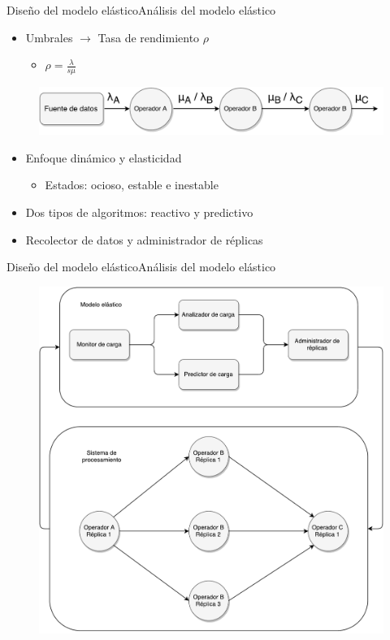 \begin{frame}{Diseño del modelo elástico}{Análisis del modelo elástico}
\begin{itemize}
\item Umbrales $\rightarrow$ Tasa de rendimiento $\rho$
	\begin{itemize}
		\item $\rho = \frac{\lambda}{s \mu}$
	\end{itemize}
\end{itemize}

\begin{figure}[!hb]
	\centering
	\includegraphics[scale=0.35]{images/AnalisisTeoriaColas.pdf}
\end{figure}

\begin{itemize}
\item Enfoque dinámico y elasticidad
\begin{itemize}
	\item Estados: ocioso, estable e inestable
\end{itemize}
\item Dos tipos de algoritmos: reactivo y predictivo
\item Recolector de datos y administrador de réplicas
\end{itemize}
\end{frame}

\begin{frame}{Diseño del modelo elástico}{Análisis del modelo elástico}
\begin{figure}[ht!]
  \centering
    \includegraphics[scale=0.3]{images/Diagrama.pdf}
\end{figure}
\end{frame}

